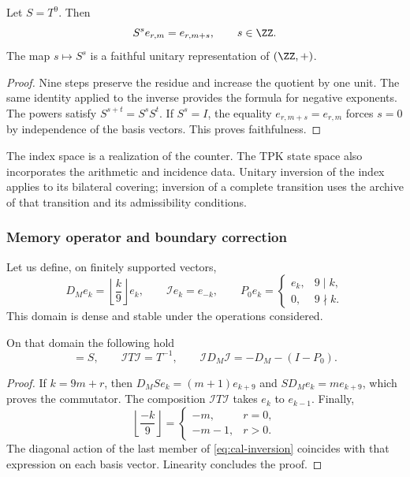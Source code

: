 \begin{teorema}
\label{thm:cal-representacion}
Let $S=T^9$. Then
\[
 S^se_{r,m}=e_{r,m+s},\qquad s\in\ZZ.
\]
The map $s\mapsto S^s$ is a faithful unitary representation of
$(\ZZ,+)$.
\end{teorema}
\begin{proof}
Nine steps preserve the residue and increase the quotient by one unit.
The same identity applied to the inverse provides the formula for
negative exponents. The powers satisfy
$S^{s+t}=S^sS^t$. If $S^s=I$, the equality
$e_{r,m+s}=e_{r,m}$ forces $s=0$ by independence of the basis
vectors. This proves faithfulness.
\end{proof}

The index space is a realization of the counter. The TPK state
space also incorporates the arithmetic and incidence data.
Unitary inversion of the index applies to its bilateral covering;
inversion of a complete transition uses the archive of that
transition and its admissibility conditions.

\subsubsection{Memory operator and boundary correction}

Let us define, on finitely supported vectors,
\[
 D_Me_k=\left\lfloor\frac k9\right\rfloor e_k,
 \qquad \mathcal Ie_k=e_{-k},
 \qquad P_0e_k=\begin{cases}e_k,&9\mid k,\\0,&9\nmid k.\end{cases}
\]
This domain is dense and stable under the operations considered.

\begin{proposicion}
On that domain the following hold
\begin{equation}
 [D_M,S]=S,\qquad
 \mathcal IT\mathcal I=T^{-1},\qquad
 \mathcal ID_M\mathcal I=-D_M-(I-P_0).
 \label{eq:cal-inversion}
\end{equation}
\end{proposicion}
\begin{proof}
If $k=9m+r$, then
$D_MS e_k=(m+1)e_{k+9}$ and $SD_Me_k=me_{k+9}$, which proves
the commutator. The composition $\mathcal IT\mathcal I$ takes
$e_k$ to $e_{k-1}$. Finally,
\[
 \left\lfloor\frac{-k}9\right\rfloor
 =\begin{cases}-m,&r=0,\\-m-1,&r>0.\end{cases}
\]
The diagonal action of the last member of \eqref{eq:cal-inversion}
coincides with that expression on each basis vector. Linearity
concludes the proof.
\end{proof}

